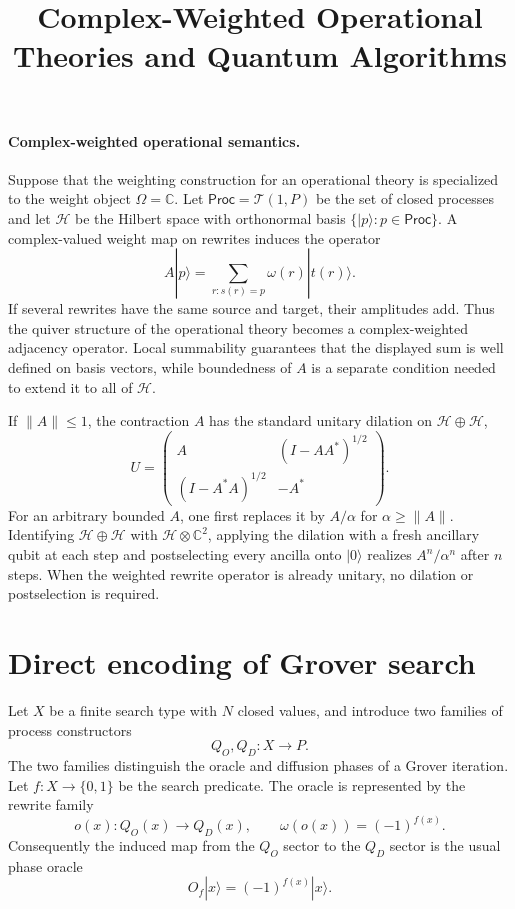 \documentclass[10pt]{article}
\title{\vspace{-1.6em}Complex-Weighted Operational Theories and Quantum Algorithms}
\author{}
\date{\vspace{-2em}}
\newcommand{\T}{\mathcal{T}}
\newcommand{\C}{\mathbb{C}}
\newcommand{\Hh}{\mathcal{H}}
\begin{document}
\maketitle
\vspace{-1em}

\paragraph{Complex-weighted operational semantics.}
Suppose that the weighting construction for an operational theory is
specialized to the weight object $\Omega=\C.$
Let $\mathsf{Proc}=\T(1,P)$ be the set of closed processes and let $\Hh$ be
the Hilbert space with orthonormal basis
$\{|p\rangle:p\in\mathsf{Proc}\}$.  A complex-valued weight map on rewrites
induces the operator
\[
A|p\rangle
=
\sum_{r:s(r)=p}\omega(r)|t(r)\rangle.
\]
If several rewrites have the same source and target, their amplitudes add.
Thus the quiver structure of the operational theory becomes a complex-weighted
adjacency operator.  Local summability guarantees that the displayed sum is
well defined on basis vectors, while boundedness of $A$ is a separate
condition needed to extend it to all of $\Hh$.

If $\|A\|\leq 1$, the contraction $A$ has the standard unitary dilation on
$\Hh\oplus\Hh$,
\[
U=
\begin{pmatrix}
A & (I-AA^*)^{1/2}\\
(I-A^*A)^{1/2} & -A^*
\end{pmatrix}.
\]
For an arbitrary bounded $A$, one first replaces it by $A/\alpha$ for
$\alpha\geq\|A\|$.  Identifying $\Hh\oplus\Hh$ with
$\Hh\otimes\C^2$, applying the dilation with a fresh ancillary qubit at each
step and postselecting every ancilla onto $|0\rangle$ realizes
$A^n/\alpha^n$ after $n$ steps.  When the weighted rewrite operator is already
unitary, no dilation or postselection is required.

\section*{Direct encoding of Grover search}

Let $X$ be a finite search type with $N$ closed values, and introduce two
families of process constructors
\[
Q_O,Q_D:X\to P.
\]
The two families distinguish the oracle and diffusion phases of a Grover
iteration.  Let $f:X\to\{0,1\}$ be the search predicate.  The oracle is
represented by the rewrite family
\[
o(x):Q_O(x)\longrightarrow Q_D(x),
\qquad
\omega(o(x))=(-1)^{f(x)}.
\]
Consequently the induced map from the $Q_O$ sector to the $Q_D$ sector is the
usual phase oracle
\[
O_f|x\rangle=(-1)^{f(x)}|x\rangle.
\]
\end{document}
